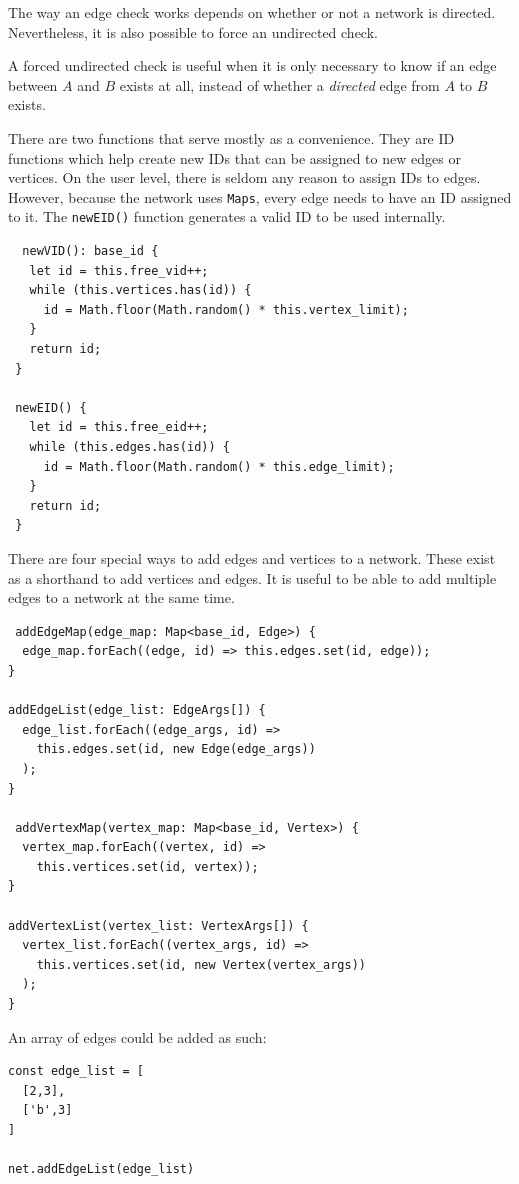 The way an edge check works depends on whether or not a network is directed.
Nevertheless, it is also possible to force an undirected check.

A forced undirected check is useful when it is only necessary to know
if an edge between $A$ and $B$ exists at all, 
instead of whether a \textit{directed} edge from $A$ to $B$ exists.

There are two functions that serve mostly as a convenience.
They are ID functions which help create new IDs that can be assigned to new edges or vertices.
On the user level, there is seldom any reason to assign IDs to edges.
However, because the network uses \texttt{Maps}, every edge needs to have
an ID assigned to it.
The \texttt{newEID()} function generates a valid ID to be used internally.

\begin{verbatim}
  newVID(): base_id {
   let id = this.free_vid++;
   while (this.vertices.has(id)) {
     id = Math.floor(Math.random() * this.vertex_limit);
   }
   return id;
 }
 
 newEID() {
   let id = this.free_eid++;
   while (this.edges.has(id)) {
     id = Math.floor(Math.random() * this.edge_limit);
   }
   return id;
 }
\end{verbatim}

There are four special ways to add edges and vertices to a network.
These exist as a shorthand to add vertices and edges.
It is useful to be able to add multiple edges to a network at
the same time.

\begin{verbatim}
 addEdgeMap(edge_map: Map<base_id, Edge>) {
  edge_map.forEach((edge, id) => this.edges.set(id, edge));
}

addEdgeList(edge_list: EdgeArgs[]) {
  edge_list.forEach((edge_args, id) =>
    this.edges.set(id, new Edge(edge_args))
  );
}

 addVertexMap(vertex_map: Map<base_id, Vertex>) {
  vertex_map.forEach((vertex, id) =>
    this.vertices.set(id, vertex));
}

addVertexList(vertex_list: VertexArgs[]) {
  vertex_list.forEach((vertex_args, id) =>
    this.vertices.set(id, new Vertex(vertex_args))
  );
}
\end{verbatim}

An array of edges could be added as such:

\begin{verbatim}
const edge_list = [
  [2,3],
  ['b',3]
]

net.addEdgeList(edge_list)
\end{verbatim}

